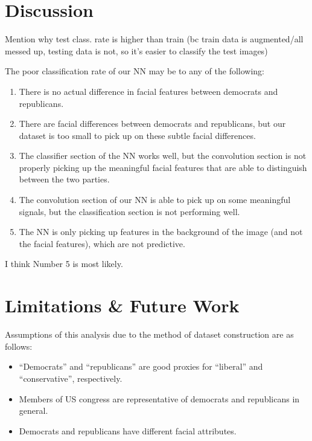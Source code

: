 \documentclass[manuscript,screen,review]{acmart}
\begin{document}
\section{Discussion}


Mention why test class. rate is higher than train (bc train data is augmented/all messed up, testing data is not, so it's easier to classify the test images)


The poor classification rate of our NN may be to any of the following:

\begin{enumerate}
\item There is no actual difference in facial features between democrats and republicans. 
\item There are facial differences between democrats and republicans, but our dataset is too small to pick up on these subtle facial differences. 
\item The classifier section of the NN works well, but the convolution section is not properly picking up the meaningful facial features that are able to distinguish between the two parties. 
\item The convolution section of our NN is able to pick up on some meaningful signals, but the classification section is not performing well. 
\item The NN is only picking up features in the background of the image (and not the facial features), which are not predictive. 
\end{enumerate}

I think Number 5 is most likely. 




\section{Limitations \& Future Work}

Assumptions of this analysis due to the method of dataset construction are as follows:

\begin{itemize}
\item ``Democrats'' and ``republicans'' are good proxies for ``liberal'' and ``conservative'', respectively. 
\item Members of US congress are representative of democrats and republicans in general. 
\item Democrats and republicans have different facial attributes. 
\end{itemize}
\end{document}
